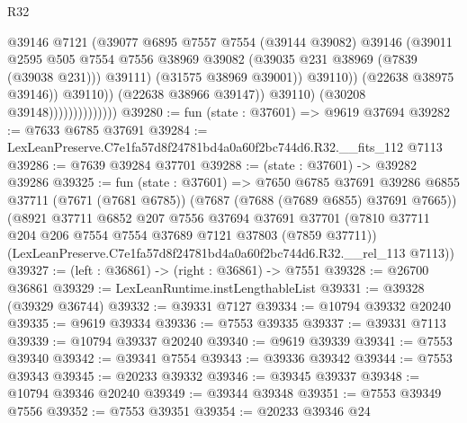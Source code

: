\begin{lexlean}{R32}
\begin{coremodule}
                                            @39146
                                            @7121
                                            (@39077
                                              @6895
                                              @7557
                                              @7554
                                              (@39144 @39082)
                                              @39146
                                              (@39011
                                                @2595
                                                @505
                                                @7554
                                                @7556
                                                @38969
                                                @39082
                                                (@39035 @231 @38969 (@7839 (@39038 @231)))
                                                @39111)
                                              (@31575 @38969 @39001))
                                            @39110))
                                        (@22638 @38975 @39146))
                                      @39110))
                                  (@22638 @38966 @39147))
                                @39110)
                              (@30208 @39148))))))))))))))
@39280 := fun (state : @37601) => @9619 @37694
@39282 := @7633 @6785 @37691
@39284 := LexLeanPreserve.C7e1fa57d8f24781bd4a0a60f2bc744d6.R32.__fits_112 @7113
@39286 := @7639 @39284 @37701
@39288 := (state : @37601) -> @39282 @39286
@39325 := fun (state : @37601) =>
  @7650
    @6785
    @37691
    @39286
    @6855
    @37711
    (@7671 (@7681 @6785))
    (@7687 (@7688 (@7689 @6855) @37691 @7665))
    (@8921
      @37711
      @6852
      @207
      @7556
      @37694
      @37691
      @37701
      (@7810 @37711 @204 @206 @7554 @7554 @37689 @7121 @37803 (@7859 @37711))
      (LexLeanPreserve.C7e1fa57d8f24781bd4a0a60f2bc744d6.R32.__rel_113 @7113))
@39327 := (left : @36861) -> (right : @36861) -> @7551
@39328 := @26700 @36861
@39329 := LexLeanRuntime.instLengthableList
@39331 := @39328 (@39329 @36744)
@39332 := @39331 @7127
@39334 := @10794 @39332 @20240
@39335 := @9619 @39334
@39336 := @7553 @39335
@39337 := @39331 @7113
@39339 := @10794 @39337 @20240
@39340 := @9619 @39339
@39341 := @7553 @39340
@39342 := @39341 @7554
@39343 := @39336 @39342
@39344 := @7553 @39343
@39345 := @20233 @39332
@39346 := @39345 @39337
@39348 := @10794 @39346 @20240
@39349 := @39344 @39348
@39351 := @7553 @39349 @7556
@39352 := @7553 @39351
@39354 := @20233 @39346 @24

\end{coremodule}
\end{lexlean}
